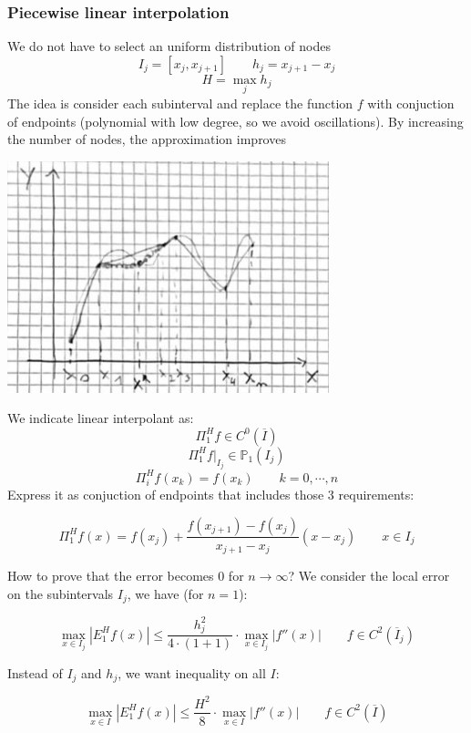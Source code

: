     \subsubsection{Piecewise linear interpolation}
    We do not have to select an uniform distribution of nodes
    $$
    I_j=\left[x_j,x_{j+1}\right]\qquad h_j=x_{j+1}-x_j
    $$
    $$
    H=\max_jh_j
    $$
    The idea is consider each subinterval and replace the function $f$ with conjuction of endpoints (polynomial with low degree, so we avoid oscillations). By increasing the number of nodes, the approximation improves
    \begin{center}
        \includegraphics[width=0.7\textwidth]{images/piecewise.png}
    \end{center}
    We indicate linear interpolant as:
    $$
    \Pi_1^Hf\in C^0(\overline{I})
    $$
    $$
    \Pi_1^Hf\Big|_{I_j}\in \mathbb{P}_1(I_j)
    $$
    $$
    \Pi_i^Hf(x_k)=f(x_k)\qquad k=0,\cdots,n
    $$
    Express it as conjuction of endpoints that includes those 3 requirements:
    \begin{LARGE}
        $$
        \Pi_1^Hf(x)=f(x_j)+\frac{
            f(x_{j+1})-f(x_j)
        }{
            x_{j+1}-x_j
        }(x-x_j)\qquad
        x\in I_j
        $$
    \end{LARGE}
    How to prove that the error becomes 0 for $n\rightarrow\infty$? We consider the local error on the subintervals $I_j$, we have (for $n=1$):
    \begin{LARGE}
        $$
        \max_{x\in I_j}\left|E_1^Hf(x)\right|
        \leq
        \frac{
            h_j^2
        }{
            4\cdot(1+1)
        }\cdot
        \max_{x\in I_j}\left|
            f''(x)
        \right|\qquad
        f\in C^2(\overline{I}_j)
        $$
    \end{LARGE}
    Instead of $I_j$ and $h_j$, we want inequality on all $I$:
    \begin{LARGE}
        $$
        \max_{x\in I}\left|E_1^Hf(x)\right|
        \leq
        \frac{
            H^2
        }{
            8
        }\cdot
        \max_{x\in I}\left|
            f''(x)
        \right|\qquad
        f\in C^2(\overline{I})
        $$
    \end{LARGE}
